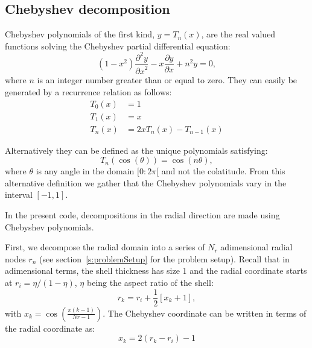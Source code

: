 \documentclass[a4paper,10pt]{book}
\begin{document}
\subsection{Chebyshev decomposition}
\label{s:ChebyshevDecomp}
Chebyshev polynomials of the first kind, $y=T_n(x)$, are the real valued
functions solving the Chebyshev partial differential equation:
\begin{equation}
 (1-x^2)\frac{\partial^2 y}{{\partial x}^2} - x\frac{\partial y}{\partial x} +
  n^2 y = 0,
\end{equation}
where $n$ is an integer number greater than or equal to zero.
They can easily be generated by a recurrence relation as follows:
\begin{subequations}
\begin{align}
 T_0(x) &= 1 \label{e:ChebyshevRecur1} \\
 T_1(x) &= x \label{e:ChebyshevRecur2} \\
 T_n(x) &= 2xT_n(x) - T_{n-1}(x) \label{e:ChebyshevRecur3}
\end{align}
\end{subequations}

Alternatively they can be defined as the unique polynomials satisfying:
\begin{equation}
 T_n(\cos(\theta)) = \cos(n\theta), %
\end{equation}
where $\theta$ is any angle in the domain $[0:2\pi[$ and not the colatitude.
From this alternative definition we gather that the Chebyshev polynomials vary
in the interval $[-1,1]$.

In the present code, decompositions in the radial direction are made using
Chebyshev polynomials.

First, we decompose the radial domain into a series of $N_r$ adimensional radial
nodes $r_n$ (see section~\ref{s:problemSetup} for the problem setup). Recall
that in adimensional terms, the shell thickness has size 1 and the radial
coordinate starts at $r_i = \eta/(1-\eta)$, $\eta$ being the aspect ratio of the
shell:
\begin{equation}
r_k = r_i + \frac{1}{2} \left[x_k+1\right],
\end{equation}
with $x_k=\cos\left( \frac{\pi(k-1)}{Nr-1} \right)$. The Chebyshev coordinate
can be written in terms of the radial coordinate as:
\begin{equation}
x_k = 2(r_k-r_i)-1
\end{equation}
\end{document}
